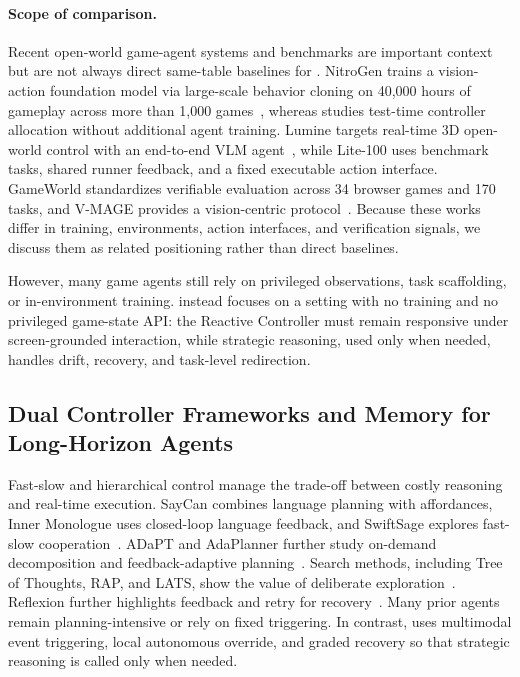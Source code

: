 \paragraph{Scope of comparison.}
Recent open-world game-agent systems and benchmarks are important context but
are not always direct same-table baselines for \method{}. NitroGen trains a
vision-action foundation model via large-scale behavior cloning on 40,000 hours
of gameplay across more than 1,000 games~\citep{magne2026nitrogen}, whereas
\method{} studies test-time controller allocation without additional agent
training. Lumine targets real-time 3D open-world control with an end-to-end VLM
agent~\citep{tan2025lumine}, while \stardojo{} Lite-100 uses benchmark tasks,
shared runner feedback, and a fixed executable action interface. GameWorld
standardizes verifiable evaluation across 34 browser games and 170 tasks, and
V-MAGE provides a vision-centric protocol~\citep{ouyang2026gameworld,zheng2025vmage}.
Because these works differ in training, environments, action interfaces, and
verification signals, we discuss them as related positioning rather than direct
baselines.

However, many game agents still rely on privileged observations, task
scaffolding, or in-environment training. \method{} instead focuses on a setting
with no training and no privileged game-state API: the Reactive Controller must
remain responsive under screen-grounded interaction, while strategic reasoning,
used only when needed, handles drift, recovery, and task-level redirection.

\subsection{Dual Controller Frameworks and Memory for Long-Horizon Agents}
\label{sec:related_work_dual_controller_memory}

Fast-slow and hierarchical control manage the trade-off between costly reasoning
and real-time execution. SayCan combines language planning with affordances, Inner Monologue
uses closed-loop language feedback, and SwiftSage explores fast-slow
cooperation~\citep{ahn2022saycan,huang2022innermonologue,lin2023swiftsage}.
ADaPT and AdaPlanner further study on-demand decomposition and
feedback-adaptive planning~\citep{prasad2024adapt,sun2023adaplanner}.
Search methods, including Tree of Thoughts, RAP, and LATS, show the value of
deliberate exploration~\citep{yao2023treeofthoughts,hao2023rap,zhou2024lats}.
Reflexion further highlights feedback and retry for recovery~\citep{shinn2023reflexion}.
Many prior agents remain planning-intensive or rely on fixed triggering. In
contrast, \method{} uses multimodal event triggering, local autonomous override,
and graded recovery so that strategic reasoning is called only when needed.

